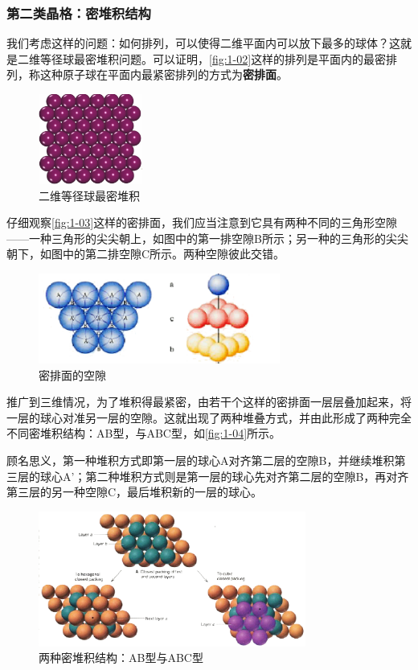 \subsubsection{第二类晶格：密堆积结构}
    我们考虑这样的问题：如何排列，可以使得二维平面内可以放下最多的球体？这就是二维等径球最密堆积问题。可以证明，\autoref{fig:1-02}这样的排列是平面内的最密排列，称这种原子球在平面内最紧密排列的方式为\textbf{密排面}。

    \begin{figure}[!htbp]
        \centering
        \includegraphics[height=8em, keepaspectratio=true]{pic/1-09}
        \caption{二维等径球最密堆积}
        \label{fig:1-02}
    \end{figure}

    仔细观察\autoref{fig:1-03}这样的密排面，我们应当注意到它具有两种不同的三角形空隙——一种三角形的尖尖朝上，如图中的第一排空隙B所示；另一种的三角形的尖尖朝下，如图中的第二排空隙C所示。两种空隙彼此交错。

    \begin{figure}[!htbp]
        \centering
        \includegraphics[height=8em, keepaspectratio=true]{pic/1-10}
        \caption{密排面的空隙}
        \label{fig:1-03}
    \end{figure}

    推广到三维情况，为了堆积得最紧密，由若干个这样的密排面一层层叠加起来，将一层的球心对准另一层的空隙。这就出现了两种堆叠方式，并由此形成了两种完全不同密堆积结构：AB型，与ABC型，如\autoref{fig:1-04}所示。
    
    顾名思义，第一种堆积方式即第一层的球心A对齐第二层的空隙B，并继续堆积第三层的球心A'；第二种堆积方式则是第一层的球心先对齐第二层的空隙B，再对齐第三层的另一种空隙C，最后堆积新的一层的球心。
    
    \begin{figure}[!htbp]
        \centering
        \includegraphics[height=12em, keepaspectratio=true]{pic/1-11}
        \caption{两种密堆积结构：AB型与ABC型}
        \label{fig:1-04}
    \end{figure}

